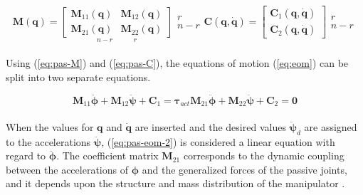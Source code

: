 \begin{subequations}
\begin{equation}\label{eq:pas-M}
    \mathbf{M(q)} =
    \underset{n-r\quad\quad\quad r}{\begin{bmatrix}
        \mathbf{M}_{11}(\mathbf{q}) & \mathbf{M}_{12}(\mathbf{q})\\
        \mathbf{M}_{21}(\mathbf{q}) & \mathbf{M}_{22}(\mathbf{q})
    \end{bmatrix}}
    \begin{matrix}
        r\\n-r
    \end{matrix}
\end{equation}
\begin{equation}\label{eq:pas-C}
    \mathbf{C(q,\dot{q})} =
    \begin{bmatrix}
        \mathbf{C}_1(\mathbf{q,\dot{q}})\\
        \mathbf{C}_2(\mathbf{q,\dot{q}})
    \end{bmatrix}
    \begin{matrix}
        r\\n-r
    \end{matrix}
\end{equation}
\end{subequations}
\\
Using (\ref{eq:pas-M}) and (\ref{eq:pas-C}), the equations of motion (\ref{eq:eom}) can be split into two separate equations.

\begin{subequations}
\begin{equation}\label{eq:pas-eom-1}
    \mathbf{M}_{11} \ddot{\boldsymbol{\phi}} + \mathbf{M}_{12} \ddot{\boldsymbol{\psi}} + \mathbf{C}_1 = \boldsymbol{\tau}_{act}
\end{equation}
\begin{equation}\label{eq:pas-eom-2}
    \mathbf{M}_{21} \ddot{\boldsymbol{\phi}} + \mathbf{M}_{22} \ddot{\boldsymbol{\psi}} + \mathbf{C}_2 = \mathbf{0}
\end{equation}
\end{subequations}
\\
When the values for $\mathbf{q}$ and $\dot{\mathbf{q}}$ are inserted and the desired values $\ddot{\boldsymbol{\psi}}_d$ are assigned to the accelerations $\ddot{\boldsymbol{\psi}}$, (\ref{eq:pas-eom-2}) is considered a linear equation with regard to $\ddot{\boldsymbol{\phi}}$. The coefficient matrix $\mathbf{M}_{21}$ corresponds to the dynamic coupling between the accelerations of $\boldsymbol{\phi}$ and the generalized forces of the passive joints, and it depends upon the structure and mass distribution of the manipulator \cite{arai1991position}.


